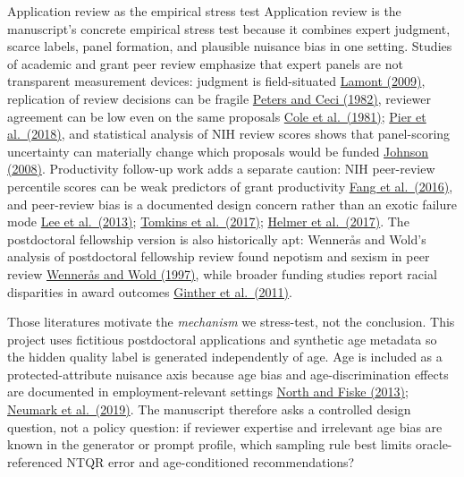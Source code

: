 \documentclass[
  ignorenonframetext,
]{beamer}
\begin{document}
\begin{frame}[allowframebreaks]{Application review as the empirical
stress test}
\protect{}\label{application-review-as-the-empirical-stress-test}
Application review is the manuscript's concrete empirical stress test
because it combines expert judgment, scarce labels, panel formation, and
plausible nuisance bias in one setting. Studies of academic and grant
peer review emphasize that expert panels are not transparent measurement
devices: judgment is field-situated
\href{https://doi.org/10.4159/9780674054158}{Lamont (2009)}, replication
of review decisions can be fragile
\href{https://doi.org/10.1017/S0140525X00011183}{Peters and Ceci
(1982)}, reviewer agreement can be low even on the same proposals
\href{https://doi.org/10.1126/science.7302566}{Cole et al.~(1981)};
\href{https://doi.org/10.1073/pnas.1714379115}{Pier et al.~(2018)}, and
statistical analysis of NIH review scores shows that panel-scoring
uncertainty can materially change which proposals would be funded
\href{https://doi.org/10.1073/pnas.0804538105}{Johnson (2008)}.
Productivity follow-up work adds a separate caution: NIH peer-review
percentile scores can be weak predictors of grant productivity
\href{https://doi.org/10.7554/eLife.13323}{Fang et al.~(2016)}, and
peer-review bias is a documented design concern rather than an exotic
failure mode \href{https://doi.org/10.1002/asi.22784}{Lee et
al.~(2013)}; \href{https://doi.org/10.1073/pnas.1707323114}{Tomkins et
al.~(2017)}; \href{https://doi.org/10.7554/eLife.21718}{Helmer et
al.~(2017)}. The postdoctoral fellowship version is also historically
apt: Wennerås and Wold's analysis of postdoctoral fellowship review
found nepotism and sexism in peer review
\href{https://doi.org/10.1038/387341a0}{Wennerås and Wold (1997)}, while
broader funding studies report racial disparities in award outcomes
\href{https://doi.org/10.1126/science.1196783}{Ginther et al.~(2011)}.

Those literatures motivate the \emph{mechanism} we stress-test, not the
conclusion. This project uses fictitious postdoctoral applications and
synthetic age metadata so the hidden quality label is generated
independently of age. Age is included as a protected-attribute nuisance
axis because age bias and age-discrimination effects are documented in
employment-relevant settings
\href{https://doi.org/10.1177/0146167213480043}{North and Fiske (2013)};
\href{https://doi.org/10.1086/701029}{Neumark et al.~(2019)}. The
manuscript therefore asks a controlled design question, not a policy
question: if reviewer expertise and irrelevant age bias are known in the
generator or prompt profile, which sampling rule best limits
oracle-referenced NTQR error and age-conditioned recommendations?
\end{frame}
\end{document}
